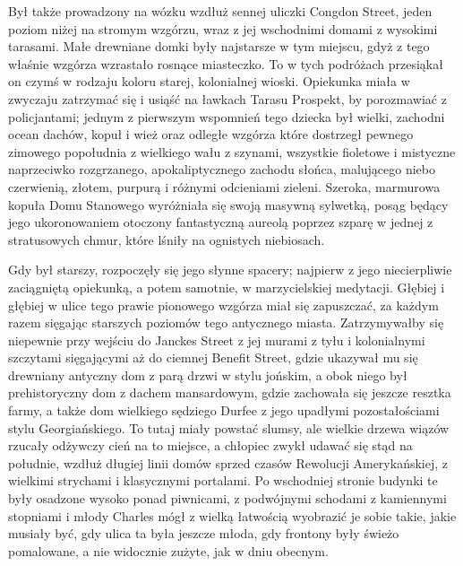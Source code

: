Był także prowadzony na wózku wzdłuż sennej uliczki Congdon Street, jeden poziom niżej na stromym wzgórzu, wraz z jej wschodnimi domami z wysokimi tarasami. Małe drewniane domki były najstarsze w tym miejscu, gdyż z tego właśnie wzgórza wzrastało rosnące miasteczko. To w tych podróżach przesiąkał on czymś w rodzaju koloru starej, kolonialnej wioski. Opiekunka miała w zwyczaju zatrzymać się i usiąść na ławkach Tarasu Prospekt, by porozmawiać z policjantami; jednym z pierwszym wspomnień tego dziecka był wielki, zachodni ocean dachów, kopuł i wież oraz odległe wzgórza które dostrzegł pewnego zimowego popołudnia z wielkiego wału z szynami, wszystkie fioletowe i mistyczne naprzeciwko rozgrzanego, apokaliptycznego zachodu słońca, malującego niebo czerwienią, złotem, purpurą i różnymi odcieniami zieleni. Szeroka, marmurowa kopuła Domu Stanowego wyróżniała się swoją masywną sylwetką, posąg będący jego ukoronowaniem otoczony fantastyczną aureolą poprzez szparę w jednej z stratusowych chmur, które lśniły na ognistych niebiosach. 

Gdy był starszy, rozpoczęły się jego słynne spacery; najpierw z jego niecierpliwie zaciągniętą opiekunką, a potem samotnie, w marzycielskiej medytacji. Głębiej i głębiej w ulice tego prawie pionowego wzgórza miał się zapuszczać, za każdym razem sięgając starszych poziomów tego antycznego miasta. Zatrzymywałby się niepewnie przy wejściu do Janckes Street z jej murami z tyłu i kolonialnymi szczytami sięgającymi aż do ciemnej Benefit Street, gdzie ukazywał mu się drewniany antyczny dom z parą drzwi w stylu jońskim, a obok niego był prehistoryczny dom z dachem mansardowym, gdzie zachowała się jeszcze resztka farmy, a także dom wielkiego sędziego Durfee z jego upadłymi pozostałościami stylu Georgiańskiego. To tutaj miały powstać slumsy, ale wielkie drzewa wiązów rzucały odżywczy cień na to miejsce, a chłopiec zwykł udawać się stąd na południe, wzdłuż długiej linii domów sprzed czasów Rewolucji Amerykańskiej, z wielkimi strychami i klasycznymi portalami. Po wschodniej stronie budynki te były osadzone wysoko ponad piwnicami, z podwójnymi schodami z kamiennymi stopniami i młody Charles mógł z wielką łatwością wyobrazić je sobie takie, jakie musiały być, gdy ulica ta była jeszcze młoda, gdy frontony były świeżo pomalowane, a nie widocznie zużyte, jak w dniu obecnym. 

